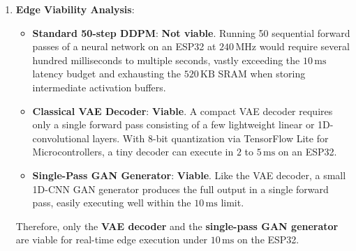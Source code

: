 \begin{enumerate}
    \item \textbf{Edge Viability Analysis}:
    \begin{itemize}
        \item \textbf{Standard 50-step DDPM}: \textbf{Not viable}. Running 50 sequential forward passes of a neural network on an ESP32 at $240\,\text{MHz}$ would require several hundred milliseconds to multiple seconds, vastly exceeding the $10\,\text{ms}$ latency budget and exhausting the $520\,\text{KB}$ SRAM when storing intermediate activation buffers.
        \item \textbf{Classical VAE Decoder}: \textbf{Viable}. A compact VAE decoder requires only a single forward pass consisting of a few lightweight linear or 1D-convolutional layers. With 8-bit quantization via TensorFlow Lite for Microcontrollers, a tiny decoder can execute in $2$ to $5\,\text{ms}$ on an ESP32.
        \item \textbf{Single-Pass GAN Generator}: \textbf{Viable}. Like the VAE decoder, a small 1D-CNN GAN generator produces the full output in a single forward pass, easily executing well within the $10\,\text{ms}$ limit.
    \end{itemize}
    Therefore, only the \textbf{VAE decoder} and the \textbf{single-pass GAN generator} are viable for real-time edge execution under $10\,\text{ms}$ on the ESP32.
\end{enumerate}

